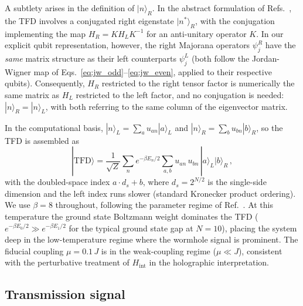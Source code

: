 \documentclass[aps,prd,twocolumn,superscriptaddress,nofootinbib,floatfix]{revtex4-2}
\newcommand{\ket}[1]{| #1 \rangle}
\newcommand{\tfd}{\mathrm{TFD}}
\begin{document}
A subtlety arises in the definition of $|n\rangle_R$. In the abstract
formulation of Refs.~\cite{Maldacena:2018lmt,Maldacena:2013xja}, the TFD
involves a conjugated right eigenstate $|n^*\rangle_R$, with the
conjugation implementing the map $H_R = K H_L K^{-1}$ for an anti-unitary
operator $K$. In our explicit qubit representation, however, the right
Majorana operators $\psi_j^R$ have the \emph{same} matrix structure as their
left counterparts $\psi_j^L$ (both follow the Jordan-Wigner map of
Eqs.~\eqref{eq:jw_odd}--\eqref{eq:jw_even}, applied to their respective
qubits). Consequently, $H_R$ restricted to the right tensor factor is
numerically the same matrix as $H_L$ restricted to the left factor, and no
conjugation is needed: $|n\rangle_R = |n\rangle_L$, with both referring to
the same column of the eigenvector matrix.

In the computational basis, $|n\rangle_L = \sum_a u_{an} |a\rangle_L$ and
$|n\rangle_R = \sum_b u_{bn} |b\rangle_R$, so the TFD is assembled as
\begin{equation}
  \ket{\tfd} = \frac{1}{\sqrt{Z}} \sum_n e^{-\beta E_n/2}
    \sum_{a,b} u_{an}\, u_{bn}\, |a\rangle_L |b\rangle_R \,,
\end{equation}
with the doubled-space index $a \cdot d_s + b$, where $d_s = 2^{N/2}$ is
the single-side dimension and the left index runs slower (standard
Kronecker product ordering). We use $\beta = 8$ throughout, following the parameter regime of
Ref.~\cite{Maldacena:2018lmt}. At this temperature the ground state
Boltzmann weight dominates the TFD ($e^{-\beta E_0/2} \gg
e^{-\beta E_1/2}$ for the typical ground state gap at $N=10$), placing
the system deep in the low-temperature regime where the wormhole signal
is prominent. The fiducial coupling $\mu = 0.1\,J$ is in the weak-coupling
regime ($\mu \ll J$), consistent with the perturbative treatment of
$H_\mathrm{int}$ in the holographic interpretation.

\subsection{Transmission signal}
\label{sec:signal}
\end{document}
